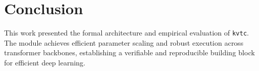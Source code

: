 \section{Conclusion}
This work presented the formal architecture and empirical evaluation of \texttt{kvtc}. The module achieves efficient parameter scaling and robust execution across transformer backbones, establishing a verifiable and reproducible building block for efficient deep learning.
